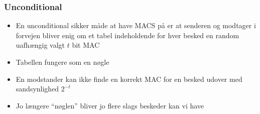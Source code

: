 \documentclass[a4, english]{article}
\begin{document}
\subsubsection{Unconditional}
\begin{itemize}
	\item En unconditional sikker måde at have MACS på er at senderen og modtager i forvejen bliver enig om et tabel indeholdende for hver besked en random uafhængig valgt $t$ bit MAC
  \item Tabellen fungere som en nøgle
  \item En modstander kan ikke finde en korrekt MAC for en besked udover med sandsynlighed $2^{-t}$ 
  \item Jo længere ``nøglen'' bliver jo flere slags beskeder kan vi have
\end{itemize}
\end{document}
